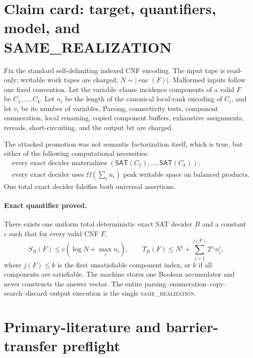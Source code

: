 \documentclass[11pt]{article}
\newcommand{\SAT}{\mathsf{SAT}}
\begin{document}
\section{Claim card: target, quantifiers, model, and SAME\_REALIZATION}

Fix the standard self-delimiting indexed CNF encoding.  The input tape is
read-only; writable work tapes are charged; $N=|\operatorname{enc}(F)|$.
Malformed inputs follow one fixed convention.  Let the variable--clause
incidence components of a valid $F$ be $C_1,\ldots,C_k$.  Let $n_i$ be the
length of the canonical local-rank encoding of $C_i$, and let $v_i$ be its
number of variables.  Parsing, connectivity tests, component enumeration,
local renaming, copied component buffers, exhaustive assignments, rereads,
short-circuiting, and the output bit are charged.

The attacked promotion was not semantic factorization itself, which is true,
but either of the following computational necessities:
\begin{align*}
 &\text{every exact decider materializes }(\SAT(C_1),\ldots,\SAT(C_k));
                                                               \tag{VEC}\\
 &\text{every exact decider uses }\Omega\!\left(\sum_i n_i\right)
   \text{ peak writable space on balanced products}.          \tag{ADDSPACE}
\end{align*}
One total exact decider falsifies both universal assertions.

\paragraph{Exact quantifier proved.}
There exists one uniform total deterministic exact SAT decider $B$ and a
constant $c$ such that for every valid CNF $F$,
\[
 S_B(F)\le c\left(\log N+\max_i n_i\right),
 \qquad
 T_B(F)\le N^c+\sum_{i=1}^{j(F)}2^{v_i}n_i^c,                 \tag{1}
\]
where $j(F)\le k$ is the first unsatisfiable component index, or $k$ if all
components are satisfiable.  The machine stores one Boolean accumulator and
never constructs the answer vector.  The entire parsing--enumeration--copy--
search--discard--output execution is the single \textsc{same\_realization}.

\section{Primary-literature and barrier-transfer preflight}
\end{document}

